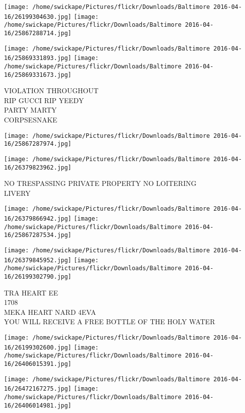 \documentclass[10pt,letterpaper]{article}
\begin{document}
\texttt{[image: /home/swickape/Pictures/flickr/Downloads/Baltimore 2016-04-16/26199304630.jpg]}
\texttt{[image: /home/swickape/Pictures/flickr/Downloads/Baltimore 2016-04-16/25867288714.jpg]}

\texttt{[image: /home/swickape/Pictures/flickr/Downloads/Baltimore 2016-04-16/25869331893.jpg]}
\texttt{[image: /home/swickape/Pictures/flickr/Downloads/Baltimore 2016-04-16/25869331673.jpg]}

VIOLATION THROUGHOUT\\
RIP GUCCI RIP YEEDY\\
PARTY MARTY\\
CORPSESNAKE\\
\pagebreak

\texttt{[image: /home/swickape/Pictures/flickr/Downloads/Baltimore 2016-04-16/25867287974.jpg]}

\vspace{0.25in}
\texttt{[image: /home/swickape/Pictures/flickr/Downloads/Baltimore 2016-04-16/26379823962.jpg]}

NO TRESPASSING PRIVATE PROPERTY NO LOITERING\\
LIVERY\\
\pagebreak

\texttt{[image: /home/swickape/Pictures/flickr/Downloads/Baltimore 2016-04-16/26379866942.jpg]}
\texttt{[image: /home/swickape/Pictures/flickr/Downloads/Baltimore 2016-04-16/25867287534.jpg]}

\texttt{[image: /home/swickape/Pictures/flickr/Downloads/Baltimore 2016-04-16/26379845952.jpg]}
\texttt{[image: /home/swickape/Pictures/flickr/Downloads/Baltimore 2016-04-16/26199302790.jpg]}

TRA HEART EE\\
1708\\
MEKA HEART NARD 4EVA\\
YOU WILL RECEIVE A FREE BOTTLE OF THE HOLY WATER\\
\pagebreak

\texttt{[image: /home/swickape/Pictures/flickr/Downloads/Baltimore 2016-04-16/26199302600.jpg]}
\texttt{[image: /home/swickape/Pictures/flickr/Downloads/Baltimore 2016-04-16/26406015391.jpg]}

\texttt{[image: /home/swickape/Pictures/flickr/Downloads/Baltimore 2016-04-16/26472167275.jpg]}
\texttt{[image: /home/swickape/Pictures/flickr/Downloads/Baltimore 2016-04-16/26406014981.jpg]}
\end{document}
